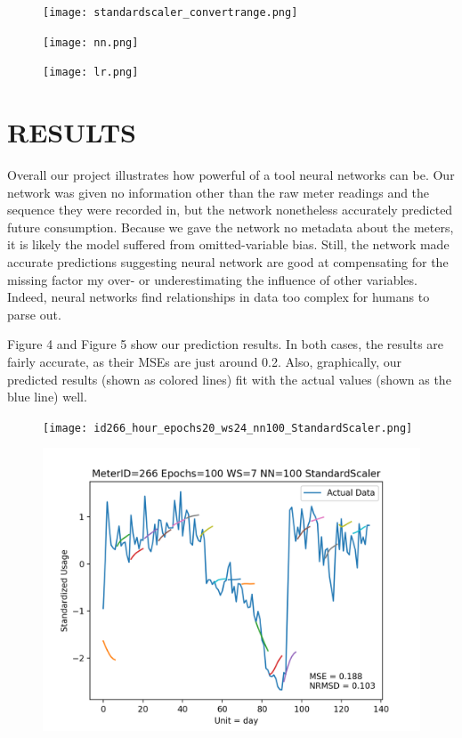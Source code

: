 \documentclass[letterpaper, 11 pt, conference]{ieeeconf}  %
\begin{document}
\vspace{5pt}

\begin{figure}[h]
\caption{}
\centering
\texttt{[image: standardscaler\_convertrange.png]}
\end{figure}

\begin{figure}[h]
\caption{}
\centering
\texttt{[image: nn.png]}
\end{figure}

\begin{figure}[h]
\caption{}
\centering
\texttt{[image: lr.png]}
\end{figure}

\section{RESULTS}

Overall our project illustrates how powerful of a tool neural networks can be. Our network was given no information other than the raw meter readings and the sequence they were recorded in, but the network nonetheless accurately predicted future consumption. Because we gave the network no metadata about the meters, it is likely the model suffered from omitted-variable bias. Still, the network made accurate predictions suggesting neural network are good at compensating for the missing factor my over- or underestimating the influence of other variables. Indeed, neural networks find relationships in data too complex for humans to parse out.

Figure 4 and Figure 5 show our prediction results. In both cases, the results are fairly accurate, as their MSEs are just around 0.2. Also, graphically, our predicted results (shown as colored lines) fit with the actual values (shown as the blue line) well.

\begin{figure}[h]
\caption{}
\centering
\texttt{[image: id266\_hour\_epochs20\_ws24\_nn100\_StandardScaler.png]}
\end{figure}

\begin{figure}[h]
\caption{}
\centering
\includegraphics[scale=.5]{id266_day_epochs100_ws7_nn100_StandardScaler.png}
\end{figure}
\end{document}
